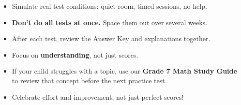 {%
\begin{tcolorbox}[
    enhanced,
    colback=funCream,
    colframe=funYellow!60,
    arc=10pt,
    outer arc=10pt,
    boxrule=1.5pt,
    left=6mm, right=6mm, top=4mm, bottom=4mm,
    title={\textcolor{funYellowDark}{\faUsers}~\textbf{A Note for Parents \& Teachers}},
    colbacktitle=funYellow!30,
    coltitle=funYellowDark,
    fonttitle=\sffamily\bfseries,
]
    \sffamily\small
    \begin{itemize}[leftmargin=*, itemsep=3pt]
        \item Simulate real test conditions: quiet room, timed sessions, no help.
        \item \textbf{Don't do all tests at once.} Space them out over several weeks.
        \item After each test, review the Answer Key and explanations together.
        \item Focus on \textbf{understanding}, not just scores.
        \item If your child struggles with a topic, use our \textbf{Grade 7 Math Study Guide}
            to review that concept before the next practice test.
        \item Celebrate effort and improvement, not just perfect scores!
    \end{itemize}
\end{tcolorbox}

}

\newpage
